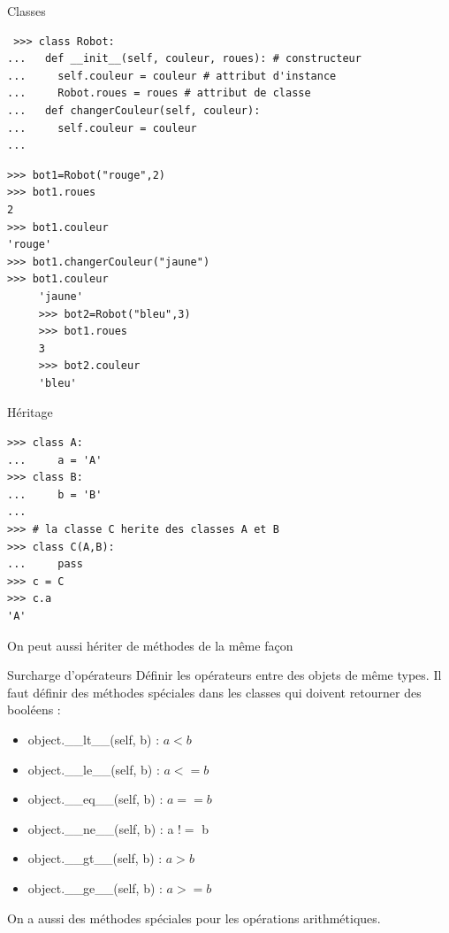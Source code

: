 \documentclass{beamer}
\begin{document}
\begin{frame}[fragile]{Classes}
\begin{lstlisting}
 >>> class Robot:
...   def __init__(self, couleur, roues): # constructeur
...     self.couleur = couleur # attribut d'instance
...     Robot.roues = roues # attribut de classe
...   def changerCouleur(self, couleur):
...     self.couleur = couleur
...
\end{lstlisting}
\vspace{-15px}
\begin{lstlisting}[multicols=2, numbers=none] 
>>> bot1=Robot("rouge",2)
>>> bot1.roues
2
>>> bot1.couleur
'rouge'
>>> bot1.changerCouleur("jaune")
>>> bot1.couleur
     'jaune'
     >>> bot2=Robot("bleu",3)
     >>> bot1.roues
     3
     >>> bot2.couleur
     'bleu'
\end{lstlisting}
\end{frame}

\begin{frame}[fragile]{Héritage}
\begin{lstlisting}
>>> class A:
...     a = 'A'
>>> class B:
...     b = 'B'
... 
>>> # la classe C herite des classes A et B
>>> class C(A,B):
...     pass
>>> c = C
>>> c.a
'A'
\end{lstlisting}
On peut aussi hériter de méthodes de la même façon
\end{frame}

\begin{frame}[fragile]{Surcharge d'opérateurs}
Définir les opérateurs entre des objets de même types. Il faut définir des méthodes spéciales dans les classes qui doivent retourner des booléens :
\begin{itemize}
 \item object.\_\_lt\_\_(self, b) : $a < b$
 \item object.\_\_le\_\_(self, b) : $a <= b$
 \item object.\_\_eq\_\_(self, b) : $a == b$
 \item object.\_\_ne\_\_(self, b) : a $!=$ b
 \item object.\_\_gt\_\_(self, b) : $a > b$
 \item object.\_\_ge\_\_(self, b) : $a >= b$
\end{itemize}
On a aussi des méthodes spéciales pour les opérations arithmétiques.
\end{frame}
\end{document}

